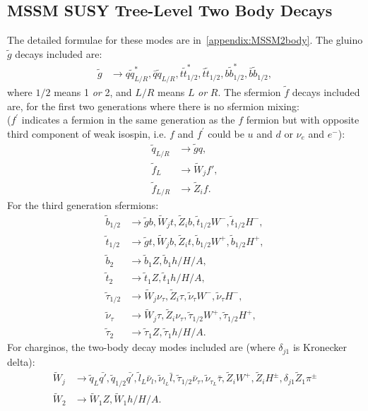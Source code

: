 \documentclass[final,3p,times]{elsarticle}
\begin{document}
\subsection{MSSM SUSY Tree-Level Two Body Decays}
The detailed formulae for these modes are in~\ref{appendix:MSSM2body}.
The gluino $\tilde{g}$ decays included are:
\begin{align*}
\tilde{g} &\rightarrow q \tilde{q}_{L/R}^* , \bar{q} \tilde{q}_{L/R}, t \tilde{t}_{1/2}^*, \bar{t} \tilde{t}_{1/2},
b \tilde{b}_{1/2}^*, \bar{b} \tilde{b}_{1/2},
\end{align*}
where $1/2$ means 1 {\em or}\/ 2, and $L/R$ means $L$ {\em or} $R$.
The sfermion $\tilde{f}$ decays included are, for the first two generations
where there is no sfermion mixing: \\ ($f^{'}$ indicates a fermion in the same
generation as the $f$ fermion but with opposite third component of weak
isospin, i.e. $f$ and $f^{'}$ could be $u$ and $d$ or $\nu_{e}$ and $e^{-}$): 
\begin{align*}
\tilde{q}_{L/R} &\rightarrow \tilde{g} q, \\
\tilde{f}_{L} &\rightarrow \tilde{W}_{j} f', \\
\tilde{f}_{L/R} &\rightarrow \tilde{Z}_{i} f.
\end{align*}
For the third generation sfermions:
\begin{align*}
\tilde{b}_{1/2} &\rightarrow \tilde{g} b, \tilde{W}_{j} t, \tilde{Z}_{i} b, \tilde{t}_{1/2} W^-, \tilde{t}_{1/2} H^-, \\
\tilde{t}_{1/2} &\rightarrow \tilde{g} t, \tilde{W}_{j} b, \tilde{Z}_{i} t, \tilde{b}_{1/2} W^+, \tilde{b}_{1/2} H^+,\\
\tilde{b}_{2} &\rightarrow \tilde{b}_{1} Z, \tilde{b}_{1} h/H/A, \\
\tilde{t}_{2} &\rightarrow \tilde{t}_{1} Z, \tilde{t}_{1} h/H/A, \\
\tilde{\tau}_{1/2} &\rightarrow \tilde{W}_{j} \nu_{\tau}, \tilde{Z}_{i} \tau, \tilde{\nu}_{\tau} W^-, \tilde{\nu}_{\tau} H^-, \\
\tilde{\nu}_{\tau} &\rightarrow \tilde{W}_{j} \tau, \tilde{Z}_{i} \nu_{\tau},
                     \tilde{\tau}_{1/2} W^+, \tilde{\tau}_{1/2} H^+, \\
\tilde{\tau}_{2} &\rightarrow \tilde{\tau}_{1} Z, \tilde{\tau}_{1} h/H/A. 
\end{align*}
For charginos, the two-body decay modes included are (where $\delta_{j1}$ is
Kronecker delta):
\begin{align*}
\tilde{W}_{j} &\rightarrow \tilde{q}_L \bar{q'}, \tilde{q}_{1/2} \bar{q'},
                \tilde{l}_L \bar{\nu}_{l}, \tilde{\nu}_{{l}_{L}} \bar{l},
                \tilde{\tau}_{1/2} \bar{\nu}_{\tau}, \tilde{\nu}_{{\tau}_{L}}
                \bar{\tau},  \tilde{Z}_{i} W^+, \tilde{Z}_{i} H^\pm,
                \delta_{j1}\tilde{Z}_1 \pi^\pm  \\
\tilde{W}_{2} &\rightarrow \tilde{W}_{1} Z, \tilde{W}_{1} h/H/A.
\end{align*}
\end{document}
